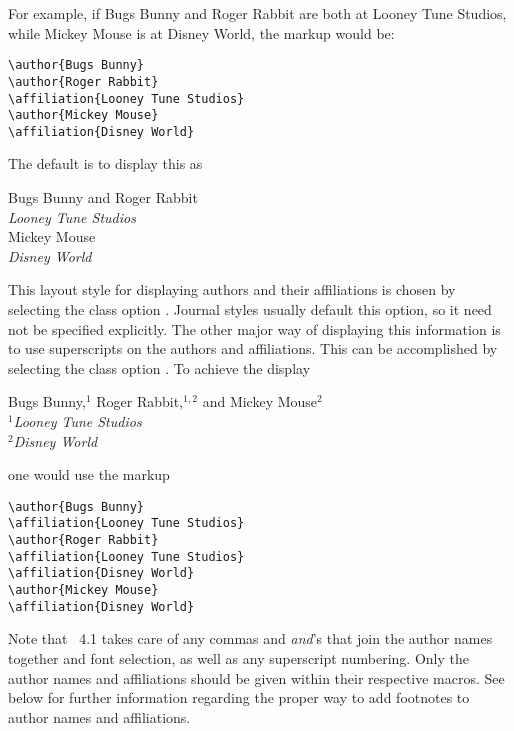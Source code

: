 \documentclass[%
,aps%
 ,twocolumn%
 ,secnumarabic%
,amssymb, amsmath,nobibnotes, aps, prl, floatfix]{revtex4-1}
\begin{document}
For example, if Bugs Bunny and Roger Rabbit are both at Looney Tune
Studios, while Mickey Mouse is at Disney World, the markup would be:
\begin{verbatim}
\author{Bugs Bunny}
\author{Roger Rabbit}
\affiliation{Looney Tune Studios}
\author{Mickey Mouse}
\affiliation{Disney World}
\end{verbatim}
The default is to display this as 
\begin{center}
Bugs Bunny and Roger Rabbit\\
\emph{Looney Tune Studios}\\
Mickey Mouse\\
\emph{Disney World}\\
\end{center}
This layout style for displaying authors and their affiliations is
chosen by selecting the class option
. Journal styles usually default this option,
 so it need not be specified explicitly. The other major way of displaying this
information is to use superscripts on the authors and
affiliations. This can be accomplished by selecting the class option
. To achieve the display
\begin{center}
Bugs Bunny,$^{1}$ Roger Rabbit,$^{1,2}$ and Mickey Mouse$^{2}$\\
\emph{$^{1}$Looney Tune Studios}\\
\emph{$^{2}$Disney World}\\
\end{center}
one would use the markup
\begin{verbatim}
\author{Bugs Bunny}
\affiliation{Looney Tune Studios}
\author{Roger Rabbit}
\affiliation{Looney Tune Studios}
\affiliation{Disney World}
\author{Mickey Mouse}
\affiliation{Disney World}
\end{verbatim}

Note that \revtex~4.1 takes care of any commas and \emph{and}'s that join
the author names together and font selection, as well as any
superscript numbering. Only the author names and affiliations should
be given within their respective macros. See below for further information
regarding the proper way to add footnotes to author names and affiliations.
\end{document}
